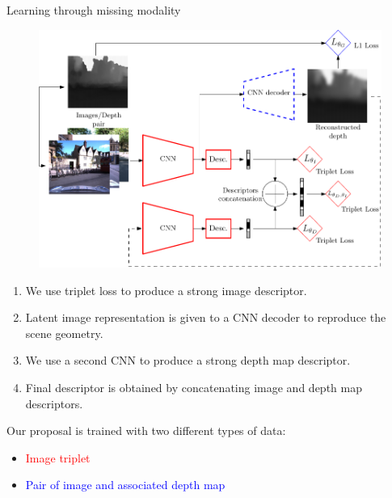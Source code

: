 \documentclass[final]{beamer}
\newlength{\colwidth}
\begin{document}
\begin{frame}[t]
\begin{columns}[t]
\begin{column}{\colwidth}
  \begin{block}{Learning through missing modality}
    \begin{figure}
		\centering
		\includegraphics[width=\linewidth]{vect/method/fig3/final_color}	    
    \end{figure}
    
    \begin{enumerate}
      \item We use triplet loss to produce a strong image descriptor.
      \item Latent image representation is given to a CNN decoder to reproduce the scene geometry.
      \item We use a second CNN to produce a strong depth map descriptor.
      \item Final descriptor is obtained by concatenating image and depth map descriptors.
    \end{enumerate}        
    
    Our proposal is trained with two different types of data:
    \begin{itemize}
    	\item \textcolor{red}{Image triplet}
    	\item \textcolor{blue}{Pair of image and associated depth map}
    \end{itemize}
  \end{block}

  \vspace{1.5cm}
  

\end{column}
\end{columns}
\end{frame}
\end{document}

